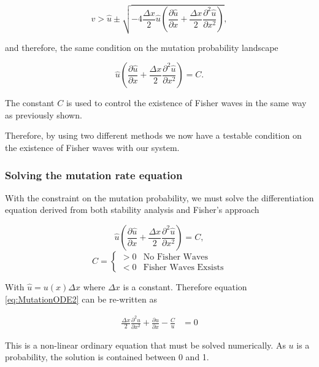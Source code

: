 \documentclass[12pt, a4paper,]{article}
\begin{document}
\begin{equation}
v  > \hat{u} \pm  \sqrt{- 4 \frac{\Delta x}{2} \hat{u} \left( \frac{\partial \hat{u}}{\partial x} + \frac{\Delta x}{2} \frac{\partial ^2 \hat{u}}{\partial x ^2} \right) },
\end{equation}

and therefore, the same condition on the mutation probability landscape

\begin{equation}
\hat{u} \left( \frac{\partial \hat{u}}{\partial x} + \frac{\Delta x}{2} \frac{\partial ^2 \hat{u}}{\partial x ^2} \right) = C.
\end{equation}

The constant $C$ is used to control the existence of Fisher waves in the same way as previously shown. 

Therefore, by using two different methods we now have a testable condition on the existence of Fisher waves with our system. 


\subsubsection{Solving the mutation rate equation}

With the constraint on the mutation probability, we must solve the differentiation equation derived from both stability analysis and Fisher's approach

\begin{equation}
\hat{u} \left( \frac{\partial \hat{u}}{\partial	x} + \frac{\Delta x}{2} \frac{\partial ^2 \hat{u}}{\partial x ^2} \right) = C,
\label{eq:MutationODE2}
\end{equation}
\begin{equation}
C = \begin{cases}
> 0 & \text{No Fisher Waves} \\
< 0 & \text{Fisher Waves Exsists}
\end{cases}
\end{equation}

With $\hat{u} = u(x) \Delta x $ where $\Delta x$ is a constant. Therefore equation \eqref{eq:MutationODE2} can be re-written as

\begin{align}
\frac{\Delta x}{2} \frac{\partial ^2 u}{\partial x ^2} + \frac{\partial u}{\partial x} - \frac{C}{u}  & = 0
\end{align}

This is a non-linear ordinary equation that must be solved numerically. As $u$ is a probability, the solution is contained between 0 and 1.  
\end{document}
